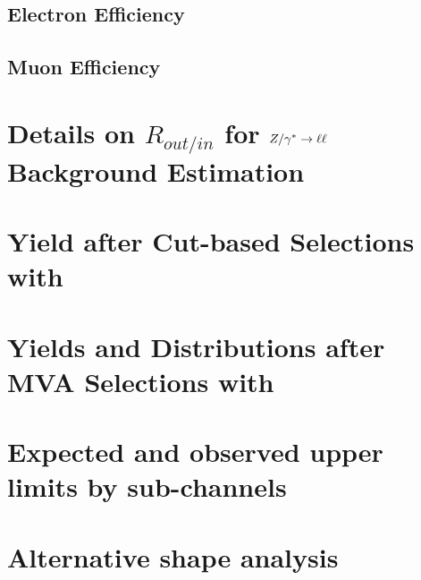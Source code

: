 \documentclass{cmspaper}
\begin{document}
     \subsection{Electron Efficiency}
     
     \subsection{Muon Efficiency}
     

\clearpage 

\section{ Details on $R_{out/in}$ for $Z/\gamma^*\to\ell\ell$ Background Estimation}
     \label{app:appendix_dyr}
     
\clearpage




\clearpage 

  \section{Yield after Cut-based Selections with \intlumi }
     \label{app:appendix_cutresults}
     
\clearpage

  \section{Yields and Distributions after MVA Selections with \intlumi }
     \label{app:appendix_bdtresults}
     

\clearpage

  \section{Expected and observed upper limits by sub-channels}
     \label{app:subchannels}
     

\clearpage
  \section{Alternative shape analysis}
     \label{app:appendix_altshape}
     
\end{document}
